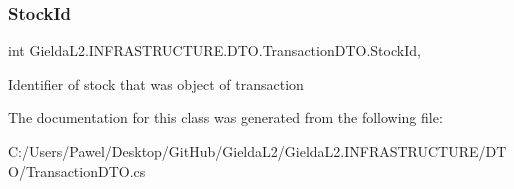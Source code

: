 \subsubsection{\texorpdfstring{StockId}{StockId}}
{\footnotesize\ttfamily int Gielda\+L2.\+I\+N\+F\+R\+A\+S\+T\+R\+U\+C\+T\+U\+R\+E.\+D\+T\+O.\+Transaction\+D\+T\+O.\+Stock\+Id\hspace{0.3cm}{\ttfamily [get]}, {\ttfamily [set]}}



Identifier of stock that was object of transaction 



The documentation for this class was generated from the following file\+:\begin{DoxyCompactItemize}
\item 
C\+:/\+Users/\+Pawel/\+Desktop/\+Git\+Hub/\+Gielda\+L2/\+Gielda\+L2.\+I\+N\+F\+R\+A\+S\+T\+R\+U\+C\+T\+U\+R\+E/\+D\+T\+O/Transaction\+D\+T\+O.\+cs\end{DoxyCompactItemize}
